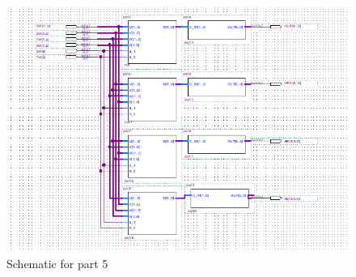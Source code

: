 \clearpage
\begin{figure}[h]
    \centering
    \includegraphics[width=\textwidth]{source/picture/Lab1/Lab1_5.png}
    \caption{Schematic for part 5}
\end{figure}
\clearpage

